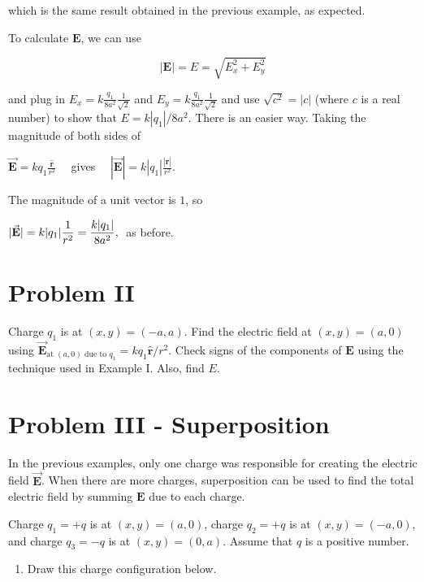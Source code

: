 \documentclass{article}
\newcommand{\ds}[0]{\displaystyle}
\newcommand{\rhat}[0]{\hat{\mathbf{r}}}
\newcommand{\bfvec}[1]{\vec{\mathbf{#1}}}
\begin{document}
which is the same result obtained in the previous example, as expected.

To calculate $\mathbf{E}$, we can use

\begin{equation}
|\mathbf{E}|=E=\sqrt{E_x^2+E_y^2}
\end{equation}

and plug in $E_x=k\frac{q_1}{8a^2}\frac{1}{\sqrt{2}}$ and $E_y=k\frac{q_1}{8a^2}\frac{1}{\sqrt{2}}$ and use $\sqrt{c^2}=|c|$ (where $c$ is a real number) to show that $E=k|q_1|/{8a^2}$. There is an easier way. Taking the magnitude of both sides of

$\ds\bfvec{E}=kq_1\frac{\rhat}{r^2}\quad$
gives
$\quad\ds|\bfvec{E}|=k|q_1|\frac{|\rhat|}{r^2}$.

The magnitude of a unit vector is $1$, so

$\ds|\bfvec{E}|=k|q_1|\frac{1}{r^2}=\frac{k|q_1|}{8a^2},\thickspace$ as before.

\section{Problem II}

Charge $q_1$ is at $(x,y)=(-a,a)$. Find the electric field at $(x,y)=(a, 0)$ using $\bfvec{E}_{\text{at }(a,0)\text{ due to }q_1}=kq_1{\rhat}/{r^2}$. Check signs of the components of $\mathbf{E}$ using the technique used in Example I. Also, find $E$.



\newpage

\section{Problem III - Superposition}

In the previous examples, only one charge was responsible for creating the electric field $\bfvec{E}$. When there are more charges, superposition can be used to find the total electric field by summing $\mathbf{E}$ due to each charge.

Charge $q_1 = +q$ is at $(x, y) = (a, 0)$, charge $q_2 = +q$ is at $(x, y) = (-a, 0)$, and charge $q_3 = -q$ is at $(x, y) = (0, a)$. Assume that $q$ is a positive number.

\begin{enumerate}

  \item Draw this charge configuration below.

\end{enumerate}
\end{document}
